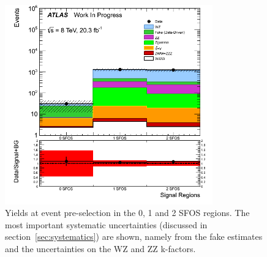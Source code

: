 \begin{figure}[ht!]
\centering
\includegraphics[width=0.8\textwidth]{figures/SFOSPreselection.png}
\caption{Yields at event pre-selection in the 0, 1 and 2 SFOS regions.  
The most important systematic uncertainties 
(discussed in section~\ref{sec:systematics}) are shown, 
namely from the fake estimates and the uncertainties on the WZ and ZZ k-factors.}
\label{fig:preselection_nsfos}
\end{figure}

